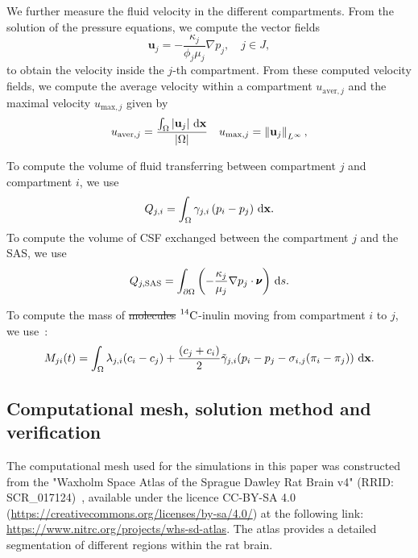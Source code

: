 \documentclass[10pt]{article}
\newcommand{\1}{^{(1)}}
\newcommand{\2}{^{(2)}}
\newcommand*{\dd}{\mathop{\kern0pt\mathrm{d}}\!{}}
\newcommand{\norm}[1]{\left\lVert#1\right\rVert}
\newcommand {\x}   {\mathbf{x}}
\newcommand{\Cinulin}{$\prescript{14}{}{\text{C}}$-inulin }
\providecommand{\DIFdeltex}[1]{{\protect\color{red}\sout{#1}}}                      %
\providecommand{\DIFaddbegin}{} %
\providecommand{\DIFaddend}{} %
\providecommand{\DIFdelbegin}{} %
\providecommand{\DIFdelend}{} %
\providecommand{\DIFdel}[1]{\texorpdfstring{\DIFdeltex{#1}}{}} %
\newcommand{\DIFscaledelfig}{0.5}
\newlength{\DIFdelgraphicswidth} %
\newlength{\DIFdelgraphicsheight} %
\newcommand{\DIFaddincludegraphics}[2][]{{\color{blue}\fbox{\DIFOincludegraphics[#1]{#2}}}} %
\newcommand{\DIFdelincludegraphics}[2][]{%
\sbox{\DIFdelgraphicsbox}{\DIFOincludegraphics[#1]{#2}}%
\settoboxwidth{\DIFdelgraphicswidth}{\DIFdelgraphicsbox} %
\settoboxtotalheight{\DIFdelgraphicsheight}{\DIFdelgraphicsbox} %
\scalebox{\DIFscaledelfig}{%
\parbox[b]{\DIFdelgraphicswidth}{\usebox{\DIFdelgraphicsbox}\\[-\baselineskip] \rule{\DIFdelgraphicswidth}{0em}}\llap{\resizebox{\DIFdelgraphicswidth}{\DIFdelgraphicsheight}{%
\setlength{\unitlength}{\DIFdelgraphicswidth}%
\begin{picture}(1,1)%
\thicklines\linethickness{2pt} %
{\color[rgb]{1,0,0}\put(0,0){\framebox(1,1){}}}%
{\color[rgb]{1,0,0}\put(0,0){\line( 1,1){1}}}%
{\color[rgb]{1,0,0}\put(0,1){\line(1,-1){1}}}%
\end{picture}%
}\hspace*{3pt}}} %
} %
\DeclareRobustCommand{\DIFaddbegin}{\DIFOaddbegin \let\includegraphics\DIFaddincludegraphics} %
\DeclareRobustCommand{\DIFaddend}{\DIFOaddend \let\includegraphics\DIFOincludegraphics} %
\DeclareRobustCommand{\DIFdelbegin}{\DIFOdelbegin \let\includegraphics\DIFdelincludegraphics} %
\DeclareRobustCommand{\DIFdelend}{\DIFOaddend \let\includegraphics\DIFOincludegraphics} %
\begin{document}
We further measure the fluid velocity in the different compartments. From the solution of the pressure equations, we compute the vector fields
\begin{equation}
    \mathbf u_j = -\frac{\kappa_j}{\phi_j \mu_j}\nabla p_j, \quad j\in J, 
    \label{eq:velo}
\end{equation}
to obtain the velocity inside the $j$-th compartment. 
From these computed velocity fields, we compute the average velocity within a compartment $u_{\text{aver},j}$ and the maximal velocity $u_{\text{max},j}$ given by 
\begin{equation}
u_{\text{aver},j} = \frac{\int_\Omega | \mathbf u_j | \, \dd \x}{| \Omega |}\quad u_{\text{max},j} = \norm{ \mathbf u_j }_{L^\infty},
\end{equation}

To compute the volume of fluid transferring between compartment $j$ and compartment $i$, we use
\begin{equation}
Q_{j,i} = \int_{\Omega}  \gamma_{j , i} \left( p_i - p_j \right)\, \dd \x.
\label{eq:compute-transfer}
\end{equation}
To compute the volume of CSF exchanged between the compartment $j$ and the SAS, we use 
\begin{equation}
Q_{j,\text{SAS}} = \int_{\partial \Omega} \left(- \frac{\kappa_j}{ \mu_j}\nabla p_j  \cdot\pmb{\nu}\right) \,\dd s.\label{eq:compute-transfer-SAS}
\end{equation}


To compute the mass of \DIFdelbegin \DIFdel{molecules }\DIFdelend \DIFaddbegin \Cinulin \DIFaddend moving from compartment $i$ to $j$, we use~\cite{jarzynska2006application}: 
\begin{equation}
    M_{ji}(t) = \int_\Omega  \lambda_{j, i}( c_i- c_j) +  \frac{(c_j+c_i)}{2} \tilde \gamma_{j , i} (p_i - p_j-\sigma_{i,j}(\pi_i-\pi_j))  \, \dd \x.
    \label{eq:matrixM}
\end{equation}
\subsection{Computational mesh, solution method and verification} \label{section: mesh}
The computational mesh used for the simulations in this paper was constructed from the "Waxholm Space Atlas of the Sprague Dawley Rat Brain v4" (RRID: \textsf{SCR\_017124})~\cite{papp2014, atlasv4}, available under the licence CC-BY-SA 4.0 (\url{https://creativecommons.org/licenses/by-sa/4.0/}) at the following link: \url{https://www.nitrc.org/projects/whs-sd-atlas}. The atlas provides a detailed segmentation of different regions within the rat brain. 
\end{document}
